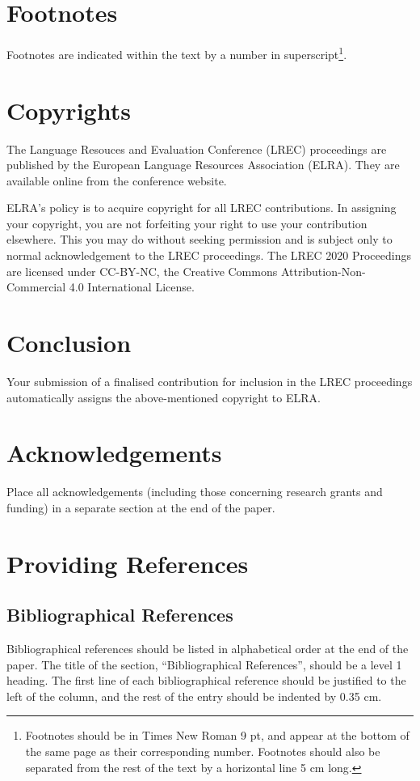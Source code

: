 \documentclass[10pt, a4paper]{article}
\begin{document}
\section{Footnotes}

Footnotes are indicated within the text by a number in
superscript\footnote{Footnotes should be in Times New Roman 9 pt, and appear at
the bottom of the same page as their corresponding number. Footnotes should also
be separated from the rest of the text by a horizontal line 5 cm long.}.

\section{Copyrights}

The Language Resouces and Evaluation Conference (LREC)
proceedings are published by the European Language Resources Association (ELRA).
They are available online from the conference website.


ELRA's policy is to acquire copyright for all LREC contributions. In assigning
your copyright, you are not forfeiting your right to use your contribution
elsewhere. This you may do without seeking permission and is subject only to
normal acknowledgement to the LREC proceedings. The LREC 2020 Proceedings are
licensed under CC-BY-NC, the Creative Commons Attribution-Non-Commercial 4.0
International License.

\section{Conclusion}

Your submission of a finalised contribution for inclusion in the LREC
proceedings automatically assigns the above-mentioned copyright to ELRA.

\section{Acknowledgements}

Place all acknowledgements (including those concerning research grants and
funding) in a separate section at the end of the paper.

\section{Providing References}

\subsection{Bibliographical References} 
Bibliographical references should be listed in alphabetical order at the
end of the paper. The title of the section, ``Bibliographical References'',
should be a level 1 heading. The first line of each bibliographical reference
should be justified to the left of the column, and the rest of the entry should
be indented by 0.35 cm.
\end{document}
